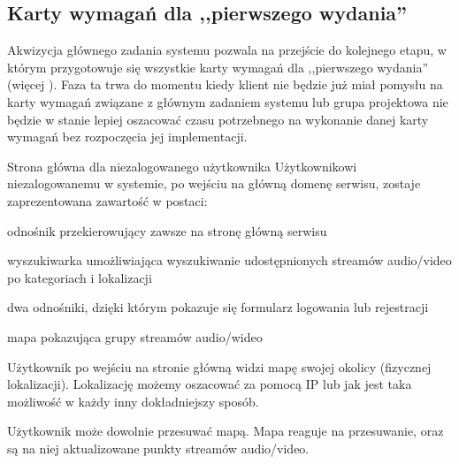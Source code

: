 \subsection{Karty wymagań dla ,,pierwszego wydania''}
\label{sec:EtapIswKWDPW}

Akwizycja głównego zadania systemu pozwala na przejście do kolejnego etapu, w którym przygotowuje się wszystkie karty wymagań dla ,,pierwszego wydania'' (więcej ). Faza ta trwa do momentu kiedy klient nie będzie już miał pomysłu na karty wymagań związane z głównym zadaniem systemu lub grupa projektowa nie będzie w stanie lepiej oszacować czasu potrzebnego na wykonanie danej karty wymagań bez rozpoczęcia jej implementacji.

\begin{userstory}{Strona główna dla niezalogowanego użytkownika}
    Użytkownikowi niezalogowanemu w systemie, po wejściu na główną domenę serwisu, zostaje zaprezentowana zawartość w postaci:
    \begin{packed_enum}
        \item odnośnik przekierowujący zawsze na stronę główną serwisu
        \item wyszukiwarka umożliwiająca wyszukiwanie udostępnionych streamów audio/video po kategoriach i lokalizacji
        \item dwa odnośniki, dzięki którym pokazuje się formularz logowania lub rejestracji
        \item mapa pokazująca grupy streamów audio/wideo
    \end{packed_enum}

    \begin{tests}
        \item{
            Użytkownik po wejściu na stronie główną widzi mapę swojej okolicy (fizycznej lokalizacji). Lokalizację możemy oszacować za pomocą IP lub jak jest taka możliwość w każdy inny dokładniejszy sposób.
        }
        \item{
            Użytkownik może dowolnie przesuwać mapą. Mapa reaguje na przesuwanie, oraz są na niej aktualizowane punkty streamów audio/video.
        }
    \end{tests}
\end{userstory}

